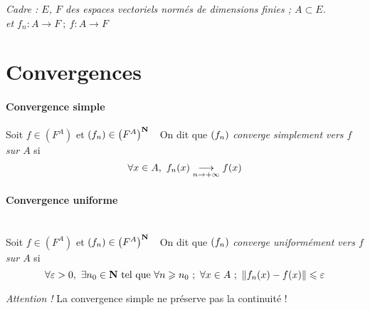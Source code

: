 

\textit{Cadre : $E$, $F$ des espaces vectoriels normés de dimensions finies ; $A\subset E$.} \\

\textit{ et $f_n : A\longrightarrow F ~;~f : A\longrightarrow F$} \\

\minitoc

\section{Convergences}

    \traitd
    \paragraph{Convergence simple}
        Soit $f\in \left( F^A \right)$ et $(f_n) \in \left( F^A \right)^{{\mathbf{N}}}~~$  On dit que $(f_n)$ \emph{converge simplement vers 
        $f$ sur $A$} si 
        \[ 
            \forall x\in A , ~ f_n(x) \underset{n\rightarrow +\infty}{\longrightarrow} f(x)
       	\vspace{-25pt}
        \] 
    \traitdouble
    \paragraph{Convergence uniforme} ~\\
        Soit $f\in \left( F^A \right)$ et $(f_n) \in \left( F^A \right)^{{\mathbf{N}}}~~$  On dit que $(f_n)$ \emph{converge uniformément 
        vers $f$ sur $A$} si 
        \[ 
            \forall \varepsilon >0 ,~\exists n_0 \in\N ~\mathrm{tel} ~\mathrm{que} ~\forall n\geqslant n_0 ~;~ \forall x\in A~;~ \norm{f_n(x) - f(x) } \leqslant \varepsilon 
        	\vspace{-25pt}
        \]	 
    \trait	

     \medskip
    
    {\small \emph{Attention !} La convergence simple ne préserve pas la continuité !}  \medskip \\

    

